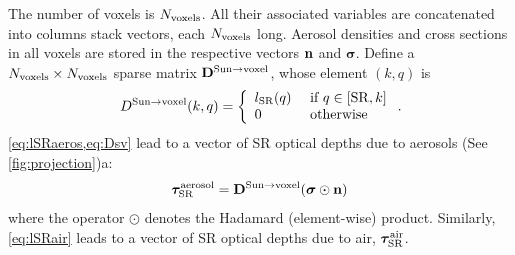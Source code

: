 \documentclass[10pt,letterpaper]{article}
\newcommand{\vect}[1]{\bm{#1}}
\begin{document}
The number of voxels is $N_{\rm voxels}$. All their associated
variables are concatenated into columns stack vectors, each $N_{\rm
  voxels}$ long. Aerosol densities and cross sections in all voxels
are stored in the respective vectors ${\bf n}$ and
$\vect{\sigma}$. Define a $N_{\rm voxels}\times N_{\rm voxels}$ sparse
matrix ${\bf D}^{\mathrm{Sun \rightarrow voxel}}$, whose element
$(k,q)$ is
\begin{equation}
  D^{\mathrm{Sun \rightarrow voxel}}(k,q) =
  \left\{
    \begin{array}{ll}
      l_{\rm SR}(q) & \mbox{ if $q \in[{\rm SR},k]$} \\
      0  & \mbox{ otherwise}
      \label{eq:Dsv}
    \end{array}
  \right.
  .
  \hspace{-0.05cm}
\end{equation}
\cref{eq:lSRaeros,eq:Dsv} lead to a vector of SR optical depths due to
aerosols (See \cref{fig:projection})a:
\begin{equation}
  \vect{\tau}_{\rm SR}^{\rm aerosol}=
  {\bf D}^{\mathrm{Sun \rightarrow voxel}}
  (\vect{\sigma} \odot {\bf n})
  \label{eq:tauSRvec1}
\end{equation}
where the operator $\odot$ denotes the Hadamard (element-wise)
product. Similarly, \cref{eq:lSRair} leads to a vector of SR optical
depths due to air, $\vect{\tau}_{\rm SR}^{\rm air}$.
\end{document}
